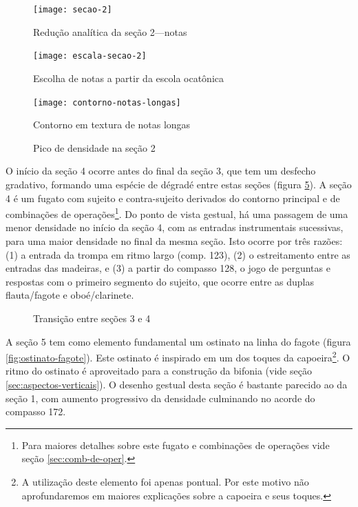 \begin{figure}
  \centering
  \texttt{[image: secao-2]}
  \caption{Redução analítica da seção 2---notas}
  \label{fig:notas-secao-2}
\end{figure}

\begin{figure}
  \centering
  \texttt{[image: escala-secao-2]}
  \caption{Escolha de notas a partir da escola ocatônica}
  \label{fig:escala-secao-2}
\end{figure}

\begin{figure}
  \centering
  \texttt{[image: contorno-notas-longas]}
  \caption{Contorno em textura de notas longas}
  \label{fig:contorno-notas-longas}
\end{figure}

\begin{figure}
  \centering
  \caption{Pico de densidade na seção 2}
  \label{fig:pico-densidade-secao-2}
\end{figure}

O início da seção 4 ocorre antes do final da seção 3, que tem um
desfecho gradativo, formando uma espécie de dégradé entre estas seções
(figura \ref{fig:transicao-3-4}). A seção 4 é um fugato com sujeito e
contra-sujeito derivados do contorno principal e de combinações de
operações\footnote{Para maiores detalhes sobre este fugato e
  combinações de operações vide seção \ref{sec:comb-de-oper}.}. Do
ponto de vista gestual, há uma passagem de uma menor densidade no
início da seção 4, com as entradas instrumentais sucessivas, para uma
maior densidade no final da mesma seção. Isto ocorre por três razões:
(1) a entrada da trompa em ritmo largo (comp. 123), (2) o
estreitamento entre as entradas das madeiras, e (3) a partir do
compasso 128, o jogo de perguntas e respostas com o primeiro segmento
do sujeito, que ocorre entre as duplas flauta/fagote e oboé/clarinete.

\begin{figure}
  \centering
  \caption{Transição entre seções 3 e 4}
  \label{fig:transicao-3-4}
\end{figure}

A seção 5 tem como elemento fundamental um ostinato na linha do fagote
(figura \ref{fig:ostinato-fagote}). Este ostinato é inspirado em um
dos toques da capoeira\footnote{A utilização deste elemento foi apenas
  pontual. Por este motivo não aprofundaremos em maiores explicações
  sobre a capoeira e seus toques.}. O ritmo do ostinato é aproveitado
para a construção da bifonia (vide seção
\ref{sec:aspectos-verticais}). O desenho gestual desta seção é
bastante parecido ao da seção 1, com aumento progressivo da densidade
culminando no acorde do compasso 172.

